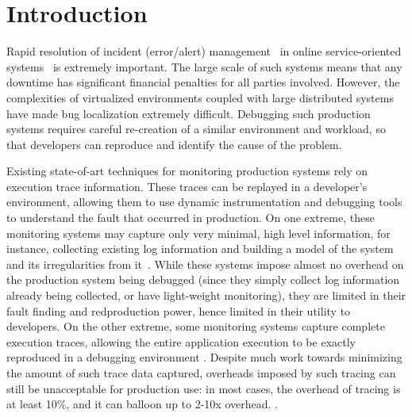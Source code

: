 \section{Introduction}
\label{sec:parikshanIntro}

Rapid resolution of incident (error/alert) management~\cite{sasase2013} in online service-oriented systems~\cite{microservice-book,hdfs,cassandra,redis} is extremely important.
The large scale of such systems means that any downtime has significant financial penalties for all parties involved.
However, the complexities of virtualized environments coupled with large distributed systems have made bug localization extremely difficult.
Debugging such production systems requires careful re-creation of a similar
environment and workload, so that developers can reproduce and identify the cause of the problem.

Existing state-of-art techniques for monitoring production systems rely on execution trace information. 
These traces can be replayed in a developer's environment, allowing them to use dynamic instrumentation and debugging tools to understand the fault that occurred in production.
On one extreme, these monitoring systems may capture only very minimal, high
level information, for instance, collecting existing log information and
building a model of the system and its irregularities from it~\cite{magpie,fay,failuresketching,problemsolvingSysTap}. 
While these systems impose almost no overhead on the production system being
debugged (since they simply collect log information already being collected, or
have light-weight monitoring), they are limited in their fault finding and redproduction power, hence limited in their utility to developers.
On the other extreme, some monitoring systems capture complete execution traces, allowing the entire application execution to be exactly reproduced in a debugging environment \cite{odr,revirt,laadan2010transparent,geels2007friday}.
Despite much work towards minimizing the amount of such trace data captured, overheads imposed by such tracing can still be unacceptable for production use: in most cases, the overhead of tracing is at least 10\%, and it can balloon up to 2-10x overhead. \cite{pinplay,drdebug}.

